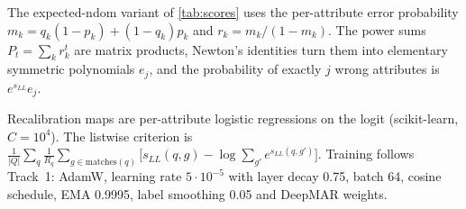 \documentclass[10pt,twocolumn,letterpaper]{article}
\begin{document}
The expected-ndom variant of \cref{tab:scores} uses the per-attribute error probability $m_k=q_k(1-p_k)+(1-q_k)p_k$ and $r_k=m_k/(1-m_k)$. The power sums $P_t=\sum_kr_k^t$ are matrix products, Newton's identities turn them into elementary symmetric polynomials $e_j$, and the probability of exactly $j$ wrong attributes is $e^{s_{LL}}e_j$.

Recalibration maps are per-attribute logistic regressions on the logit (scikit-learn, $C=10^4$). The listwise criterion is $\frac1{|Q|}\sum_q\frac1{R_q}\sum_{g\in\text{matches}(q)}\big[s_{LL}(q,g)-\log\sum_{g'}e^{s_{LL}(q,g')}\big]$. Training follows Track~1: AdamW, learning rate $5\cdot10^{-5}$ with layer decay 0.75, batch 64, cosine schedule, EMA 0.9995, label smoothing 0.05 and DeepMAR weights.
\end{document}
